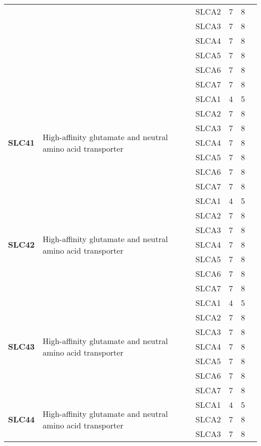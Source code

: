 \documentclass[12pt]{report}
\begin{document}
\begin{center}
\begin{longtable}{|p{1.5cm}|p{3.2cm}|p{1.9cm}|p{1.65cm}|p{3cm}|p{3cm}|}
\cline{3-6}
&&SLCA2&7 & 8&\\ 
\cline{3-6}
&&SLCA3&7 & 8&\\ 
\cline{3-6}
&&SLCA4&7 & 8&\\ 
\cline{3-6}
&&SLCA5&7 & 8&\\ 
\cline{3-6}
&&SLCA6&7 & 8&\\ 
\cline{3-6}
&&SLCA7&7 & 8&\\ 
\hline
\multirow{7}{1.5cm}{\textbf{SLC41}} & \multirow{7}{4cm}{High-affinity glutamate and neutral amino acid transporter} & SLCA1 & 4 & 5\\ 
\cline{3-6}
&&SLCA2&7 & 8&\\ 
\cline{3-6}
&&SLCA3&7 & 8&\\ 
\cline{3-6}
&&SLCA4&7 & 8&\\ 
\cline{3-6}
&&SLCA5&7 & 8&\\ 
\cline{3-6}
&&SLCA6&7 & 8&\\ 
\cline{3-6}
&&SLCA7&7 & 8&\\ 
\hline
\multirow{7}{1.5cm}{\textbf{SLC42}} & \multirow{7}{4cm}{High-affinity glutamate and neutral amino acid transporter} & SLCA1 & 4 & 5\\ 
\cline{3-6}
&&SLCA2&7 & 8&\\ 
\cline{3-6}
&&SLCA3&7 & 8&\\ 
\cline{3-6}
&&SLCA4&7 & 8&\\ 
\cline{3-6}
&&SLCA5&7 & 8&\\ 
\cline{3-6}
&&SLCA6&7 & 8&\\ 
\cline{3-6}
&&SLCA7&7 & 8&\\ 
\hline
\multirow{7}{1.5cm}{\textbf{SLC43}} & \multirow{7}{4cm}{High-affinity glutamate and neutral amino acid transporter} & SLCA1 & 4 & 5\\ 
\cline{3-6}
&&SLCA2&7 & 8&\\ 
\cline{3-6}
&&SLCA3&7 & 8&\\ 
\cline{3-6}
&&SLCA4&7 & 8&\\ 
\cline{3-6}
&&SLCA5&7 & 8&\\ 
\cline{3-6}
&&SLCA6&7 & 8&\\ 
\cline{3-6}
&&SLCA7&7 & 8&\\ 
\hline
\multirow{7}{1.5cm}{\textbf{SLC44}} & \multirow{7}{4cm}{High-affinity glutamate and neutral amino acid transporter} & SLCA1 & 4 & 5\\ 
\cline{3-6}
&&SLCA2&7 & 8&\\ 
\cline{3-6}
&&SLCA3&7 & 8&\\ 

\end{longtable}
\end{center}
\end{document}
